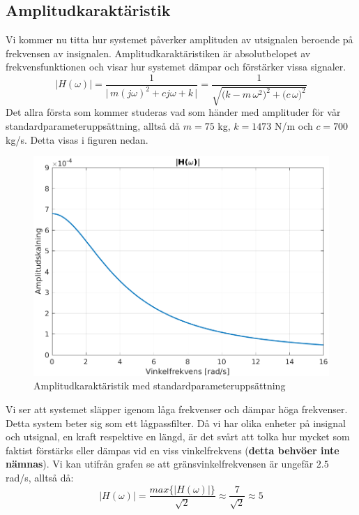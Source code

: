 \subsection{Amplitudkaraktäristik}
Vi kommer nu titta hur systemet påverker amplituden av utsignalen beroende på frekvensen av insignalen. Amplitudkaraktäristiken är absolutbelopet av frekvensfunktionen och visar hur systemet dämpar och förstärker vissa signaler. 
$$\big|H(\omega)\big|=\dfrac{1}{\Big|\,m(j\omega)^2+cj\omega+k\,\Big|}=\dfrac{1}{\sqrt{\big(k-m\,\omega^2\big)^2+\big(c\,\omega\big)^2}}$$
Det allra första som kommer studeras vad som händer med amplituder för vår standardparameteruppsättning, alltså då $m=75$ kg, $k=1473$ N/m och $c=700$ kg/s. Detta visas i figuren nedan.
\begin{figure}[H]
    \centering
    \includegraphics[scale=0.9]{bilder/amplitudkaraktaristik}
    \caption{Amplitudkaraktäristik med standardparameteruppsättning}
    \label{fig:amplitudkaraktaristik}
\end{figure}
Vi ser att systemet släpper igenom låga frekvenser och dämpar höga frekvenser. Detta system beter sig som ett lågpassfilter.
Då vi har olika enheter på insignal och utsignal, en kraft respektive en längd, är det svårt att tolka hur mycket som faktist förstärks eller dämpas vid en viss vinkelfrekvens (\textbf{detta behvöer inte nämnas}). Vi kan utifrån grafen se att gränsvinkelfrekvensen är ungefär $2.5$ rad/s, alltså då:
$$\big|H(\omega)\big|=\dfrac{max\Big\{\big|H(\omega)\big|\Big\}}{\sqrt{2}}\approx \frac{7}{\sqrt{2}} \approx 5$$
\newpage
